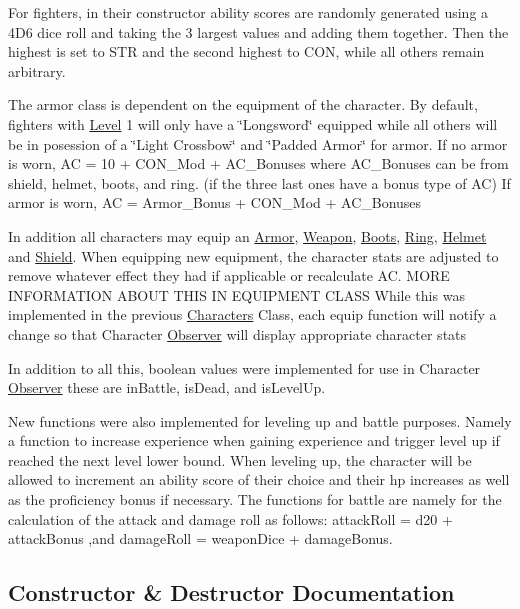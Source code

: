 For fighters, in their constructor ability scores are randomly generated using a 4\+D6 dice roll and taking the 3 largest values and adding them together. Then the highest is set to S\+TR and the second highest to C\+ON, while all others remain arbitrary.

The armor class is dependent on the equipment of the character. By default, fighters with \hyperlink{class_level}{Level} 1 will only have a \char`\"{}\+Longsword\char`\"{} equipped while all others will be in posession of a \char`\"{}\+Light Crossbow\char`\"{} and \char`\"{}\+Padded Armor\char`\"{} for armor. If no armor is worn, AC = 10 + C\+O\+N\+\_\+\+Mod + A\+C\+\_\+\+Bonuses where A\+C\+\_\+\+Bonuses can be from shield, helmet, boots, and ring. (if the three last ones have a bonus type of AC) If armor is worn, AC = Armor\+\_\+\+Bonus + C\+O\+N\+\_\+\+Mod + A\+C\+\_\+\+Bonuses

In addition all characters may equip an \hyperlink{class_armor}{Armor}, \hyperlink{class_weapon}{Weapon}, \hyperlink{class_boots}{Boots}, \hyperlink{class_ring}{Ring}, \hyperlink{class_helmet}{Helmet} and \hyperlink{class_shield}{Shield}. When equipping new equipment, the character stats are adjusted to remove whatever effect they had if applicable or recalculate AC. M\+O\+RE I\+N\+F\+O\+R\+M\+A\+T\+I\+ON A\+B\+O\+UT T\+H\+IS IN E\+Q\+U\+I\+P\+M\+E\+NT C\+L\+A\+SS While this was implemented in the previous \hyperlink{class_characters}{Characters} Class, each equip function will notify a change so that Character \hyperlink{class_observer}{Observer} will display appropriate character stats

In addition to all this, boolean values were implemented for use in Character \hyperlink{class_observer}{Observer} these are in\+Battle, is\+Dead, and is\+Level\+Up.

New functions were also implemented for leveling up and battle purposes. Namely a function to increase experience when gaining experience and trigger level up if reached the next level lower bound. When leveling up, the character will be allowed to increment an ability score of their choice and their hp increases as well as the proficiency bonus if necessary. The functions for battle are namely for the calculation of the attack and damage roll as follows\+: attack\+Roll = d20 + attack\+Bonus ,and damage\+Roll = weapon\+Dice + damage\+Bonus. 

\subsection{Constructor \& Destructor Documentation}
\hypertarget{class_characters_a695ed5b59463f54d4eb52a551a25949b}{}\label{class_characters_a695ed5b59463f54d4eb52a551a25949b} 
